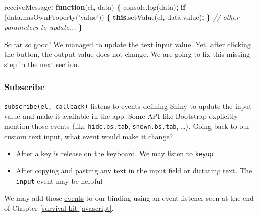 \documentclass[
]{book}
\newenvironment{Shaded}{\begin{snugshade}}{\end{snugshade}}
\newcommand{\AttributeTok}[1]{\textcolor[rgb]{0.77,0.63,0.00}{#1}}
\newcommand{\CommentTok}[1]{\textcolor[rgb]{0.56,0.35,0.01}{\textit{#1}}}
\newcommand{\ControlFlowTok}[1]{\textcolor[rgb]{0.13,0.29,0.53}{\textbf{#1}}}
\newcommand{\KeywordTok}[1]{\textcolor[rgb]{0.13,0.29,0.53}{\textbf{#1}}}
\newcommand{\NormalTok}[1]{#1}
\newcommand{\OperatorTok}[1]{\textcolor[rgb]{0.81,0.36,0.00}{\textbf{#1}}}
\newcommand{\StringTok}[1]{\textcolor[rgb]{0.31,0.60,0.02}{#1}}
\newcommand{\VariableTok}[1]{\textcolor[rgb]{0.00,0.00,0.00}{#1}}
\providecommand{\tightlist}{%
  \setlength{\itemsep}{0pt}\setlength{\parskip}{0pt}}
\begin{document}
\begin{Shaded}
\begin{Highlighting}[]
\NormalTok{receiveMessage}\OperatorTok{:} \KeywordTok{function}\NormalTok{(el}\OperatorTok{,}\NormalTok{ data) }\OperatorTok{\{}
  \VariableTok{console}\NormalTok{.}\AttributeTok{log}\NormalTok{(data)}\OperatorTok{;}
  \ControlFlowTok{if}\NormalTok{ (}\VariableTok{data}\NormalTok{.}\AttributeTok{hasOwnProperty}\NormalTok{(}\StringTok{'value'}\NormalTok{)) }\OperatorTok{\{}
    \KeywordTok{this}\NormalTok{.}\AttributeTok{setValue}\NormalTok{(el}\OperatorTok{,} \VariableTok{data}\NormalTok{.}\AttributeTok{value}\NormalTok{)}\OperatorTok{;}
  \OperatorTok{\}}
  \CommentTok{// other parameters to update...}
\OperatorTok{\}}
\end{Highlighting}
\end{Shaded}

So far so good! We managed to update the text input value. Yet, after clicking the button, the output value does not change. We are going to fix this missing step in the next section.

\hypertarget{subscribe}{%
\subsubsection{Subscribe}\label{subscribe}}

\texttt{subscribe(el,\ callback)} listens to events defining Shiny to update the input value and make it available in the app. Some API like Bootstrap explicitly mention those events (like \texttt{hide.bs.tab}, \texttt{shown.bs.tab}, \ldots).
Going back to our custom text input, what event would make it change?

\begin{itemize}
\tightlist
\item
  After a key is release on the keyboard. We may listen to \texttt{keyup}
\item
  After copying and pasting any text in the input field or dictating text. The \texttt{input} event may be helpful
\end{itemize}

We may add those \href{https://javascript.info/events-change-input}{events} to our binding using an event listener seen at the end of Chapter \ref{survival-kit-javascript}.

\begin{Shaded}
\end{Shaded}
\end{document}
